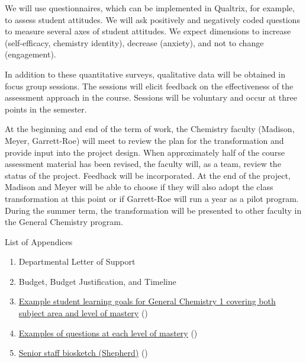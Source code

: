 \documentclass[10pt,letterpaper]{article}
\begin{document}
 We will use questionnaires, which can be implemented in Qualtrix, for example, to assess student attitudes. We will ask positively and negatively coded questions to measure several axes of student attitudes. We expect  dimensions to increase (self-efficacy, chemistry identity), decrease (anxiety), and not to change (engagement). 

 In addition to these quantitative surveys, qualitative data will be obtained in focus group sessions. The sessions will elicit feedback on the effectiveness of the assessment approach in the course. Sessions will be voluntary and occur at three points in the semester.

At the beginning and end of the term of work, the \pogil Chemistry faculty (Madison, Meyer, Garrett-Roe) will meet to review the plan for the transformation and provide input into the project design. When approximately half of the course assessment material has been revised, the \pogil faculty will, as a team, review the status of the project. Feedback will be incorporated. At the end of the project, Madison and Meyer will be able to choose if they will also adopt the class transformation at this point or if Garrett-Roe will run a year as a pilot program. During the summer term, the transformation will be presented to other faculty in the General Chemistry program.

\newpage
{}
List of Appendices
\begin{enumerate}
\item Departmental Letter of Support 
\item Budget, Budget Justification, and Timeline 
\item \hyperref[app:learning_objectives]{Example student learning goals for General Chemistry 1 covering both subject area and level of mastery} ()
\item \hyperref[app:example_questions]{Examples of questions at each level of mastery} ()
\item \hyperref[app:shepherd_biosketch]{Senior staff biosketch (Shepherd)} ()
\end{enumerate}

\raggedright\footnotesize\singlespacing
\renewcommand{\refname}{\large\textbf{References}}

\end{document}
